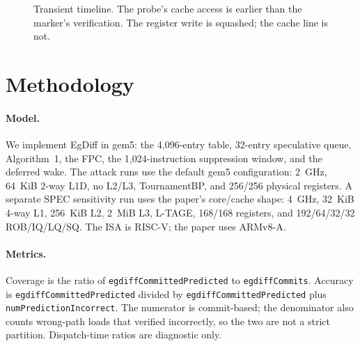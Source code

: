 \documentclass[conference]{IEEEtran}
\newcommand{\code}[1]{\texttt{\small #1}}
\begin{document}
\begin{figure}[t]
\centering
{}
\caption{Transient timeline. The probe's cache access is earlier than the
marker's verification. The register write is squashed; the cache line is
not.}
\label{fig:timeline}
\end{figure}

\section{Methodology}

\paragraph{Model.}
We implement EgDiff in gem5: the 4,096-entry table, 32-entry
speculative queue, Algorithm~1, the FPC, the 1,024-instruction
suppression window, and the deferred wake. The attack runs use the
default gem5 configuration: 2~GHz, 64~KiB 2-way L1D, no L2/L3,
TournamentBP, and 256/256 physical registers. A separate SPEC
sensitivity run uses the paper's core/cache shape: 4~GHz, 32~KiB 4-way
L1, 256~KiB L2, 2~MiB L3, L-TAGE, 168/168 registers, and
192/64/32/32 ROB/IQ/LQ/SQ. The ISA is RISC-V; the paper uses ARMv8-A.

\paragraph{Metrics.}
\begingroup\raggedright
Coverage is the ratio of \code{egdiffCommittedPredicted} to
\code{egdiffCommits}. Accuracy is \code{egdiffCommittedPredicted}
divided by \code{egdiffCommittedPredicted} plus
\code{numPredictionIncorrect}. The numerator is commit-based; the
denominator also counts wrong-path loads that verified incorrectly, so
the two are not a strict partition. Dispatch-time ratios are diagnostic
only.
\par\endgroup
\end{document}
